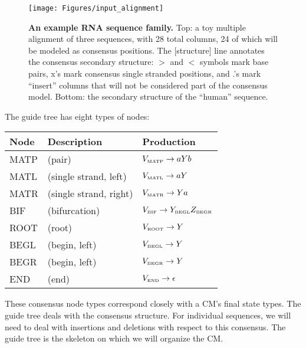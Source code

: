\documentclass[11pt]{article}
\begin{document}
\begin{figure}[t]
\begin{center}
\texttt{[image: Figures/input\_alignment]}
\end{center}
\caption{\textbf{An example RNA sequence family.} Top: a toy multiple
alignment of three sequences, with 28 total columns, 24 of which will
be modeled as consensus positions. The [structure] line annotates the
consensus secondary structure: $>$ and $<$ symbols mark base pairs,
x's mark consensus single stranded positions, and .'s mark
``insert'' columns that will not be considered part of the consensus
model. Bottom: the secondary structure of the ``human'' sequence.} 
\label{fig:input_alignment}
\end{figure}

The guide tree has eight types of nodes:

\vspace{0.5em}
\begin{tabular}{lll}
Node      & Description      &  Production           \\ \hline
MATP  & (pair)                 & $V_{\mbox{\tiny MATP}} \rightarrow a Y b$  \\
MATL  & (single strand, left)  & $V_{\mbox{\tiny MATL}} \rightarrow a Y$   \\
MATR  & (single strand, right) & $V_{\mbox{\tiny MATR}} \rightarrow Y a$   \\
BIF   & (bifurcation)          & $V_{\mbox{\tiny BIF}}  \rightarrow
Y_{\mbox{\tiny BEGL}} Z_{\mbox{\tiny BEGR}}$ \\
ROOT  & (root)                 & $V_{\mbox{\tiny ROOT}} \rightarrow Y$       \\
BEGL  & (begin, left)          & $V_{\mbox{\tiny BEGL}} \rightarrow Y$       \\
BEGR  & (begin, left)          & $V_{\mbox{\tiny BEGR}} \rightarrow Y$       \\
END   & (end)                  & $V_{\mbox{\tiny END}}  \rightarrow \epsilon$ \\ \hline
\end{tabular}
\vspace{0.5em}
 
These consensus node types correspond closely with a CM's final state
types.  The guide tree deals with the consensus structure. For
individual sequences, we will need to deal with insertions and
deletions with respect to this consensus. The guide tree is the
skeleton on which we will organize the CM.
\end{document}
